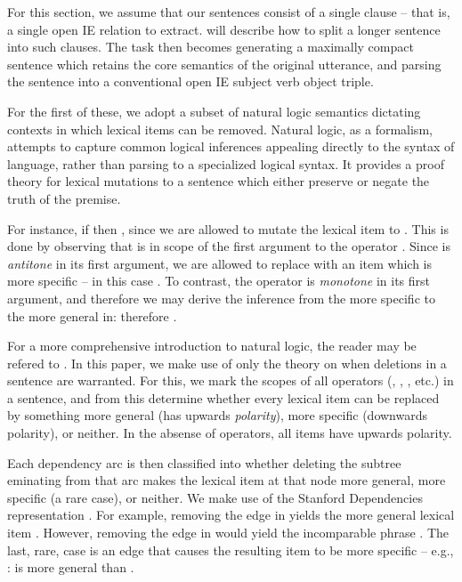 
For this section, we assume that our sentences consist of a single clause --
  that is, a single open IE relation to extract.
 will describe how to split a longer sentence into such clauses.
The task then becomes generating a maximally compact sentence which retains
  the core semantics of the original utterance, and parsing the sentence
  into a conventional open IE subject verb object triple.

For the first of these, we adopt a subset of natural logic semantics dictating
  contexts in which lexical items can be removed.
Natural logic, as a formalism, attempts to capture common logical inferences
  appealing directly to the syntax of language, rather than parsing to a
  specialized logical syntax.
It provides a proof theory for lexical mutations to a sentence which either
  preserve or negate the truth of the premise.

For instance, if  then 
  , since we are allowed to mutate
  the lexical item  to .
This is done by observing that  is in scope of the first
  argument to the operator .
Since  is \textit{antitone} in its first argument, we are allowed
  to replace  with an item which is more specific -- in this case
  .
To contrast, the operator  is \textit{monotone} in its first argument,
  and therefore we may derive the inference from the more specific
   to the more general  in:
   therefore .

For a more comprehensive introduction to natural logic, the reader may be
  refered to .
In this paper, we make use of only the theory on when deletions in a sentence
  are warranted.
For this, we mark the scopes of all operators (, , ,
  etc.) in a sentence, and from this determine whether every lexical item
  can be replaced by something more general (has upwards \textit{polarity}),
  more specific (downwards polarity), or neither.
In the absense of operators, all items have upwards polarity.

Each dependency arc is then classified into whether deleting the subtree
  eminating from that arc makes the lexical item at that node more general,
  more specific (a rare case), or neither.
We make use of the Stanford Dependencies representation 
  \cite{key:stanford-dependencies}.
For example, removing the  edge in  yields the
  more general lexical item .
However, removing the  edge in  would yield the
  incomparable phrase .
The last, rare, case is an edge that causes the resulting item to be 
  more specific -- e.g., : 
   is more general than .

